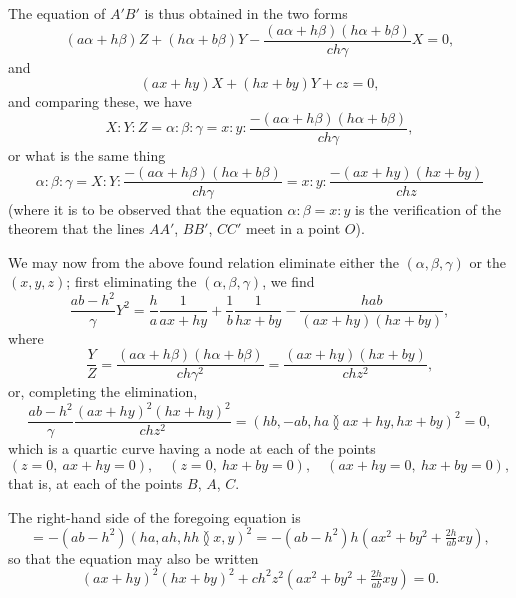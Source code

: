 \documentclass[11pt,a4paper]{article}
\theoremstyle{plain}
\begin{document}
The equation of $A'B'$ is thus obtained in the two forms
\begin{equation}
(a\alpha + h\beta)Z + (h\alpha + b\beta)Y - \frac{(a\alpha + h\beta)(h\alpha + b\beta)}{ch\gamma}X = 0,
\end{equation}
and
\begin{equation}
(ax + hy)X + (hx + by)Y + cz = 0,
\end{equation}
and comparing these, we have
\begin{equation}
X : Y : Z = \alpha : \beta : \gamma = x : y : \frac{-(a\alpha + h\beta)(h\alpha + b\beta)}{ch\gamma},
\end{equation}
or what is the same thing
\begin{equation}
\alpha : \beta : \gamma = X : Y : \frac{-(a\alpha + h\beta)(h\alpha + b\beta)}{ch\gamma} = x : y : \frac{-(ax + hy)(hx + by)}{chz}
\end{equation}
(where it is to be observed that the equation $\alpha : \beta = x : y$ is the verification of the theorem that the lines $AA'$, $BB'$, $CC'$ meet in a point $O$).

\newpage
\setcounter{equation}{23}

We may now from the above found relation eliminate either the $(\alpha, \beta, \gamma)$ or the $(x, y, z)$; first eliminating the $(\alpha, \beta, \gamma)$, we find
\begin{equation}
\frac{ab-h^2}{\gamma}Y^2 = \frac{h}{a}\frac{1}{ax + hy} + \frac{1}{b}\frac{1}{hx + by} - \frac{hab}{(ax + hy)(hx + by)},
\end{equation}
where
\begin{equation}
\frac{Y}{Z} = \frac{(a\alpha + h\beta)(h\alpha + b\beta)}{ch\gamma^2} = \frac{(ax + hy)(hx + by)}{chz^2},
\end{equation}
or, completing the elimination,
\begin{equation}
\frac{ab-h^2}{\gamma}\frac{(ax + hy)^2(hx + hy)^2}{chz^2} = (hb, -ab, ha \between ax + hy, hx + by)^2 = 0,
\end{equation}
which is a quartic curve having a node at each of the points
\begin{equation}
(z = 0,\ ax + hy = 0), \quad (z = 0,\ hx + by = 0), \quad (ax + hy = 0,\ hx + by = 0),
\end{equation}
that is, at each of the points $B$, $A$, $C$.

The right-hand side of the foregoing equation is
\begin{equation}
= -(ab - h^2)(ha, ah, hh \between x, y)^2 = -(ab - h^2)h(ax^2 + by^2 + \tfrac{2h}{ab}xy),
\end{equation}
so that the equation may also be written
\begin{equation}
(ax + hy)^2(hx + by)^2 + ch^2z^2\left(ax^2 + by^2 + \tfrac{2h}{ab}xy\right) = 0.
\end{equation}
\end{document}
